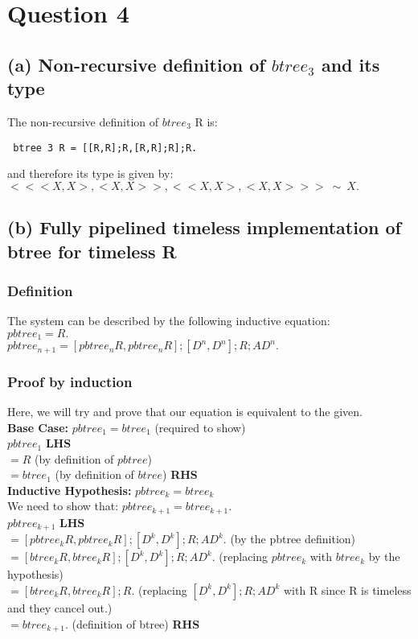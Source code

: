 \documentclass[a4paper,10pt]{article}
\begin{document}
\section*{Question 4}
\subsection*{(a) Non-recursive definition of $btree_3$ and its type}
The non-recursive definition of $btree_3$ R is:
\begin{Verbatim}
 btree 3 R = [[R,R];R,[R,R];R];R.
\end{Verbatim}
and therefore its type is given by: \\[0.25cm]
$<<<X,X>,<X,X>>,<<X,X>,<X,X>>>\:  \sim \: X.$
\subsection*{(b) Fully pipelined timeless implementation of btree for timeless R}
\subsubsection*{Definition}
The system can be described by the following inductive equation: \\[0.25cm]
$pbtree_1 = R.$ \\[0.25cm]
$pbtree_{n+1} = [pbtree_n R,pbtree_n R];[D^n,D^n];R;AD^n.$
\subsubsection*{Proof by induction}
Here, we will try and prove that our equation is equivalent to the given.\\[0.5cm]
\textbf{Base Case:}  $pbtree_1 = btree_1$ (required to show)\\[0.25cm]
$pbtree_1$ \textbf{LHS} \\[0.25cm]
$=R$  (by definition of $pbtree$) \\[0.25cm]
$=btree_1 $ (by definition of $btree$) \textbf{RHS}
\\[0.5cm]
\textbf{Inductive Hypothesis:} $pbtree_k = btree_k $ \\[0.25cm]
We need to show that: $pbtree_{k+1} = btree_{k+1}.$ \\[0.25cm]
$pbtree_{k+1}$ \textbf{LHS} \\[0.25cm]
$=[pbtree_k R,pbtree_k R];[D^k,D^k];R;AD^k.$ (by the pbtree definition)\\[0.25cm]
$=[btree_k R,btree_k R];[D^k,D^k];R;AD^k.$ (replacing $pbtree_k$ with $btree_k$ by the hypothesis)\\[0.25cm]
$=[btree_k R,btree_k R];R.$ (replacing $[D^k,D^k];R;AD^k$ with R since R is timeless and they cancel out.)\\[0.25cm]
$=btree_{k+1}.$ (definition of btree) \textbf{RHS}
\end{document}
